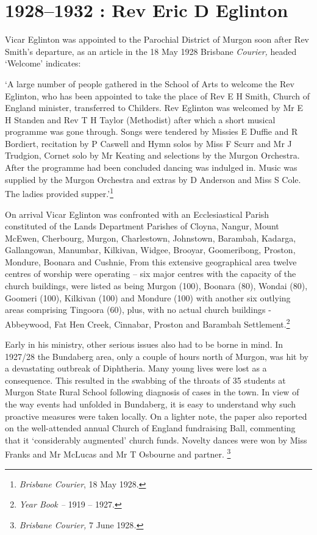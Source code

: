 \printendnotes
\setcounter{endnote}{0}
\chapter{1928--1932 : Rev Eric D Eglinton}

Vicar Eglinton was appointed to the Parochial District of Murgon soon
after Rev Smith's departure, as an article in the 18 May 1928 Brisbane
\emph{Courier,} headed `Welcome' indicates:

`A large number of people gathered in the School of Arts to welcome the
Rev Eglinton, who has been appointed to take the place of Rev E H Smith,
Church of England minister, transferred to Childers. Rev Eglinton was
welcomed by Mr E H Standen and Rev T H Taylor (Methodist) after which a
short musical programme was gone through. Songs were tendered by Missies
E Duffie and R Bordiert, recitation by P Caswell and Hymn solos by Miss
F Scurr and Mr J Trudgion, Cornet solo by Mr Keating and selections by
the Murgon Orchestra. After the programme had been concluded dancing was
indulged in. Music was supplied by the Murgon Orchestra and extras by D
Anderson and Miss S Cole. The ladies provided supper.'\footnote{\emph{Brisbane
  Courier}, 18 May 1928.}

On arrival Vicar Eglinton was confronted with an Ecclesiastical Parish
constituted of the Lands Department Parishes of Cloyna, Nangur, Mount
McEwen, Cherbourg, Murgon, Charlestown, Johnstown, Barambah, Kadarga,
Gallangowan, Manumbar, Kilkivan, Widgee, Brooyar, Goomeribong, Proston,
Mondure, Boonara and Cushnie, From this extensive geographical area
twelve centres of worship were operating -- six major centres with the
capacity of the church buildings, were listed as being Murgon (100),
Boonara (80), Wondai (80), Goomeri (100), Kilkivan (100) and Mondure
(100) with another six outlying areas comprising Tingoora (60), plus,
with no actual church buildings - Abbeywood, Fat Hen Creek, Cinnabar,
Proston and Barambah Settlement.\footnote{\emph{Year Book --} 1919 --
  1927.}

Early in his ministry, other serious issues also had to be borne in
mind. In 1927/28 the Bundaberg area, only a couple of hours north of
Murgon, was hit by a devastating outbreak of Diphtheria. Many young
lives were lost as a consequence. This resulted in the swabbing of the
throats of 35 students at Murgon State Rural School following diagnosis
of cases in the town. In view of the way events had unfolded in
Bundaberg, it is easy to understand why such proactive measures were
taken locally. On a lighter note, the paper also reported on the
well-attended annual Church of England fundraising Ball, commenting that
it `considerably augmented' church funds. Novelty dances were won by
Miss Franks and Mr McLucas and Mr T Osbourne and partner. \footnote{\emph{Brisbane
  Courier,} 7 June 1928\emph{.}}

